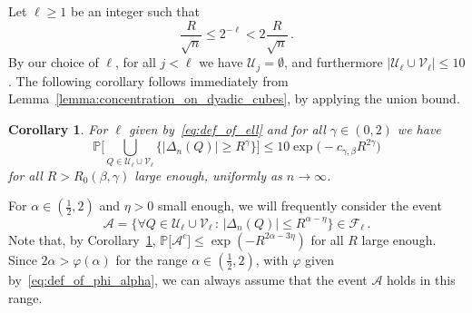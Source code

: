 \documentclass[11pt]{amsart}
\newtheorem{corollary}[theorem]{Corollary}
\theoremstyle{definition}
\theoremstyle{remark}
\numberwithin{equation}{section}
\newcommand{\bP}{\mathbb P}
\begin{document}
	Let $\ell\ge 1$ be an integer such that 
	\begin{equation}
		\label{eq:def_of_ell}
		\frac{R}{\sqrt{n}} \le 2^{-\ell} < 2\frac{R}{\sqrt{n}} \, .
	\end{equation}
	By our choice of $\ell$, for all $j< \ell$ we have $\mathcal{U}_{j} = \emptyset$, and furthermore $|\mathcal{U}_\ell \cup \mathcal{V}_\ell| \le 10$. The following corollary follows immediately from Lemma~\ref{lemma:concentration_on_dyadic_cubes}, by applying the union bound.
	\begin{corollary}
		\label{corollary:concentration_of_four_cubes_containing_the_disk}
		For $\ell$ given by~\eqref{eq:def_of_ell} and for all $\gamma\in(0,2)$ we have
		\[
		\bP\Big[ \bigcup_{Q\in \mathcal{U}_{\ell} \cup \mathcal{V}_\ell } \big\{ |\Delta_n(Q) |  \ge R^\gamma \big\} \Big] \le 10\exp\big( - c_{\gamma,\beta}R^{2\gamma} \big)
		\]
		for all $R>R_0(\beta,\gamma)$ large enough, uniformly as $n\to \infty$.
	\end{corollary}
	For $\alpha\in(\frac{1}{2},2)$ and $\eta>0$ small enough, we will frequently consider the event 
	\begin{equation}
		\label{eq:def_of_event_no_disc_in_top_cubes_containing_the_disk}
		\mathcal{A} = \Big\{ \forall  Q\in \mathcal{U}_\ell \cup \mathcal{V}_\ell \, : \, |\Delta_n(Q)| \le R^{\alpha-\eta} \Big\} \in \mathcal{F}_{\ell} \, .
	\end{equation} 
	Note that, by Corollary~\ref{corollary:concentration_of_four_cubes_containing_the_disk}, $\bP\big[\mathcal{A}^c\big] \leq \exp(-R^{2\alpha - 3\eta})$ for all $R$ large enough. Since $2\alpha>\varphi(\alpha)$ for the range $\alpha\in(\tfrac{1}{2},2)$, with $\varphi$ given by~\eqref{eq:def_of_phi_alpha}, we can always assume that the event $\mathcal{A}$ holds in this range.
	
\end{document}
